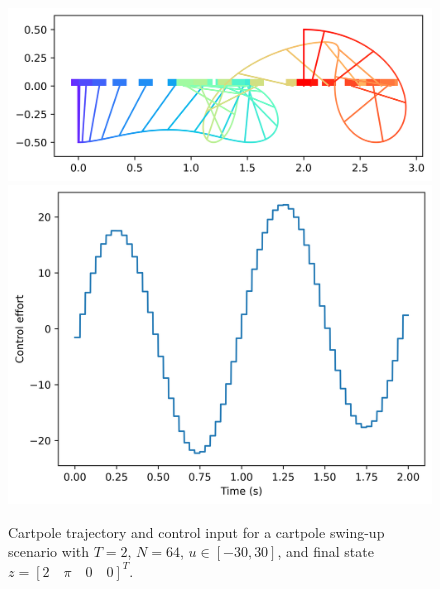 \documentclass{exam}
\begin{document}
\begin{multicols}{2}
\begin{figure}[H]
    \centering
    \includegraphics[width=1.0\linewidth]{cartpole_swingy.png}
    \includegraphics[width=1.0\linewidth]{control_inputty.png}
    \caption{Cartpole trajectory and control input for a cartpole swing-up scenario with $T = 2$, $N = 64$, $u \in [-30, 30]$, and final state $z = [2 \quad \pi \quad 0 \quad 0]^T$.}
    \label{fig:default-config-trajectory}
\end{figure}


\end{multicols}
\end{document}
